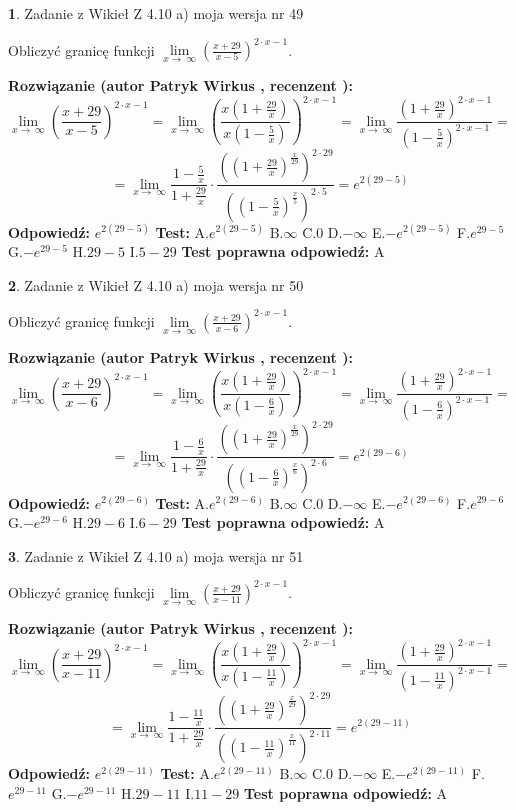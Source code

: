 \documentclass[12pt, a4paper]{article}
\theoremstyle{definition} %
\newtheorem{zad}{}
\newcommand{\zadStart}[1]{\begin{zad}#1\newline}
\newcommand{\zadStop}{\end{zad}}
\newcommand{\rozwStart}[2]{\noindent \textbf{Rozwiązanie (autor #1 , recenzent #2): }\newline}
\newcommand{\rozwStop}{\newline}
\newcommand{\odpStart}{\noindent \textbf{Odpowiedź:}\newline}
\newcommand{\odpStop}{\newline}
\newcommand{\testStart}{\noindent \textbf{Test:}\newline}
\newcommand{\testStop}{\newline}
\newcommand{\kluczStart}{\noindent \textbf{Test poprawna odpowiedź:}\newline}
\newcommand{\kluczStop}{\newline}
\begin{document}
\zadStart{Zadanie z Wikieł Z 4.10 a) moja wersja nr 49}


Obliczyć granicę funkcji  $\lim\limits_{x\to\ \infty}(\frac{x+29}{x-5})^{2\cdot x-1}$.
\zadStop
\rozwStart{Patryk Wirkus}{}
$$\lim\limits_{x\to\ \infty}(\frac{x+29}{x-5})^{2\cdot x-1} = \lim\limits_{x\to\ \infty}(\frac{x(1+\frac{29}{x})}{x(1-\frac{5}{x})})^{2\cdot x-1}=\lim\limits_{x\to\ \infty}\frac{(1+\frac{29}{x})^{2\cdot x-1}}{(1-\frac{5}{x})^{2\cdot x-1}}=$$
$$=\lim\limits_{x\to\ \infty}\frac{1-\frac{5}{x}}{1+\frac{29}{x}}\cdot\frac{((1+\frac{29}{x})^{\frac{x}{29}})^{2\cdot29}}{((1-\frac{5}{x})^{\frac{x}{5}})^{2\cdot5}}=e^{2(29-5)}$$
\rozwStop
\odpStart
$e^{2(29-5)}$
\odpStop
\testStart
A.$e^{2(29-5)}$ B.$\infty$ C.$0$ D.$-\infty$ E.$-e^{2(29-5)}$
F.$e^{29-5}$ G.$-e^{29-5}$
H.$29-5$
I.$5-29$
\testStop
\kluczStart
A
\kluczStop



\zadStart{Zadanie z Wikieł Z 4.10 a) moja wersja nr 50}


Obliczyć granicę funkcji  $\lim\limits_{x\to\ \infty}(\frac{x+29}{x-6})^{2\cdot x-1}$.
\zadStop
\rozwStart{Patryk Wirkus}{}
$$\lim\limits_{x\to\ \infty}(\frac{x+29}{x-6})^{2\cdot x-1} = \lim\limits_{x\to\ \infty}(\frac{x(1+\frac{29}{x})}{x(1-\frac{6}{x})})^{2\cdot x-1}=\lim\limits_{x\to\ \infty}\frac{(1+\frac{29}{x})^{2\cdot x-1}}{(1-\frac{6}{x})^{2\cdot x-1}}=$$
$$=\lim\limits_{x\to\ \infty}\frac{1-\frac{6}{x}}{1+\frac{29}{x}}\cdot\frac{((1+\frac{29}{x})^{\frac{x}{29}})^{2\cdot29}}{((1-\frac{6}{x})^{\frac{x}{6}})^{2\cdot6}}=e^{2(29-6)}$$
\rozwStop
\odpStart
$e^{2(29-6)}$
\odpStop
\testStart
A.$e^{2(29-6)}$ B.$\infty$ C.$0$ D.$-\infty$ E.$-e^{2(29-6)}$
F.$e^{29-6}$ G.$-e^{29-6}$
H.$29-6$
I.$6-29$
\testStop
\kluczStart
A
\kluczStop



\zadStart{Zadanie z Wikieł Z 4.10 a) moja wersja nr 51}


Obliczyć granicę funkcji  $\lim\limits_{x\to\ \infty}(\frac{x+29}{x-11})^{2\cdot x-1}$.
\zadStop
\rozwStart{Patryk Wirkus}{}
$$\lim\limits_{x\to\ \infty}(\frac{x+29}{x-11})^{2\cdot x-1} = \lim\limits_{x\to\ \infty}(\frac{x(1+\frac{29}{x})}{x(1-\frac{11}{x})})^{2\cdot x-1}=\lim\limits_{x\to\ \infty}\frac{(1+\frac{29}{x})^{2\cdot x-1}}{(1-\frac{11}{x})^{2\cdot x-1}}=$$
$$=\lim\limits_{x\to\ \infty}\frac{1-\frac{11}{x}}{1+\frac{29}{x}}\cdot\frac{((1+\frac{29}{x})^{\frac{x}{29}})^{2\cdot29}}{((1-\frac{11}{x})^{\frac{x}{11}})^{2\cdot11}}=e^{2(29-11)}$$
\rozwStop
\odpStart
$e^{2(29-11)}$
\odpStop
\testStart
A.$e^{2(29-11)}$ B.$\infty$ C.$0$ D.$-\infty$ E.$-e^{2(29-11)}$
F.$e^{29-11}$ G.$-e^{29-11}$
H.$29-11$
I.$11-29$
\testStop
\kluczStart
A
\kluczStop
\end{document}
